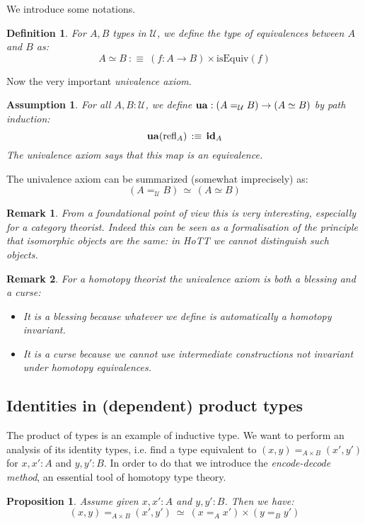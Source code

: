 \documentclass{article}
\newcommand{\sse}[1]{\medbreak \subsection{#1}}
\newcommand{\U}{{\mathcal U}}
\renewcommand{\r}{\rightarrow}
\newcommand{\Gl}{\lambda}
\newcommand{\refl}{\mathrm{refl}}
\newcommand{\id}{\mathrm{\bf id}}
\newcommand{\ua}{\mathrm{\bf ua}}
\newtheorem{definition}{Definition}
\newtheorem{proposition}{Proposition}
\newtheorem{remark}{Remark}
\newtheorem{assumption}{Assumption}
\begin{document}
We introduce some notations.

\begin{definition}
For $A,B$ types in $\U$, we define the type of equivalences between $A$ and $B$ as:
\[A\simeq B \ :\equiv \ (f:A\r B)\times \mathrm{isEquiv}(f)\]
\end{definition}

Now the very important \emph{univalence axiom}.

\begin{assumption}
For all $A,B:\U$, we define $\ua : (A=_\U B) \r (A\simeq B)$ by path induction:
\[\ua(\refl_A) \, :\equiv\, \id_A\]
The univalence axiom says that this map is an equivalence.
\end{assumption}

The univalence axiom can be summarized (somewhat imprecisely) as:
\[(A=_\U B) \, \simeq \, (A\simeq B)\]



\begin{remark}
From a foundational point of view this is very interesting, especially for a category theorist. Indeed this can be seen as a formalisation of the principle that isomorphic objects are the same: in HoTT we cannot distinguish such objects.
\end{remark} 

\begin{remark}
For a homotopy theorist the univalence axiom is both a blessing and a curse:
\begin{itemize}
\item It is a blessing because whatever we define is automatically a homotopy invariant. %
\item It is a curse because we cannot use intermediate constructions not invariant under homotopy equivalences.
\end{itemize}
\end{remark}


\sse{Identities in (dependent) product types}

The product of types is an example of inductive type. We want to perform an analysis of its identity types, i.e. find a type equivalent to $(x,y)=_{A\times B} (x',y')$ for $x,x':A$ and $y,y':B$. In order to do that we introduce the \emph{encode-decode method}, an essential tool of homotopy type theory. %

\begin{proposition}
Assume given $x,x':A$ and $y,y':B$. Then we have:
\[(x,y)=_{A\times B}(x',y')\ \simeq\ (x=_A x')\times (y=_By')\]
\end{proposition}
\end{document}
